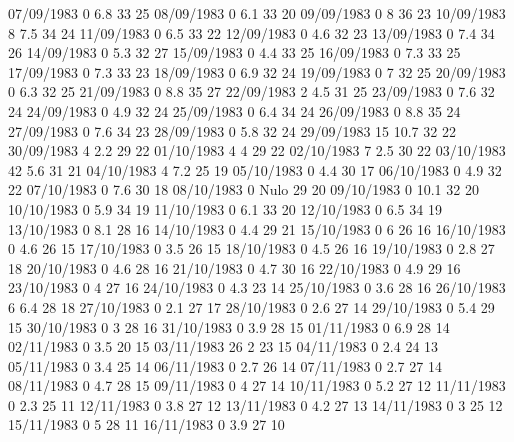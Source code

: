 07/09/1983  0      6.8    33     25 
08/09/1983  0      6.1    33     20 
09/09/1983  0      8      36     23 
10/09/1983  8      7.5    34     24 
11/09/1983  0      6.5    33     22 
12/09/1983  0      4.6    32     23 
13/09/1983  0      7.4    34     26 
14/09/1983  0      5.3    32     27 
15/09/1983  0      4.4    33     25 
16/09/1983  0      7.3    33     25 
17/09/1983  0      7.3    33     23 
18/09/1983  0      6.9    32     24 
19/09/1983  0      7      32     25 
20/09/1983  0      6.3    32     25 
21/09/1983  0      8.8    35     27 
22/09/1983  2      4.5    31     25 
23/09/1983  0      7.6    32     24 
24/09/1983  0      4.9    32     24 
25/09/1983  0      6.4    34     24 
26/09/1983  0      8.8    35     24 
27/09/1983  0      7.6    34     23 
28/09/1983  0      5.8    32     24 
29/09/1983  15     10.7   32     22 
30/09/1983  4      2.2    29     22 
01/10/1983  4      4      29     22 
02/10/1983  7      2.5    30     22 
03/10/1983  42     5.6    31     21 
04/10/1983  4      7.2    25     19 
05/10/1983  0      4.4    30     17 
06/10/1983  0      4.9    32     22 
07/10/1983  0      7.6    30     18 
08/10/1983  0     Nulo    29     20 
09/10/1983  0      10.1   32     20 
10/10/1983  0      5.9    34     19 
11/10/1983  0      6.1    33     20 
12/10/1983  0      6.5    34     19 
13/10/1983  0      8.1    28     16 
14/10/1983  0      4.4    29     21 
15/10/1983  0      6      26     16 
16/10/1983  0      4.6    26     15 
17/10/1983  0      3.5    26     15 
18/10/1983  0      4.5    26     16 
19/10/1983  0      2.8    27     18 
20/10/1983  0      4.6    28     16 
21/10/1983  0      4.7    30     16 
22/10/1983  0      4.9    29     16 
23/10/1983  0      4      27     16 
24/10/1983  0      4.3    23     14 
25/10/1983  0      3.6    28     16 
26/10/1983  6      6.4    28     18 
27/10/1983  0      2.1    27     17 
28/10/1983  0      2.6    27     14 
29/10/1983  0      5.4    29     15 
30/10/1983  0      3      28     16 
31/10/1983  0      3.9    28     15 
01/11/1983  0      6.9    28     14 
02/11/1983  0      3.5    20     15 
03/11/1983  26     2      23     15 
04/11/1983  0      2.4    24     13 
05/11/1983  0      3.4    25     14 
06/11/1983  0      2.7    26     14 
07/11/1983  0      2.7    27     14 
08/11/1983  0      4.7    28     15 
09/11/1983  0      4      27     14 
10/11/1983  0      5.2    27     12 
11/11/1983  0      2.3    25     11 
12/11/1983  0      3.8    27     12 
13/11/1983  0      4.2    27     13 
14/11/1983  0      3      25     12 
15/11/1983  0      5      28     11 
16/11/1983  0      3.9    27     10 
